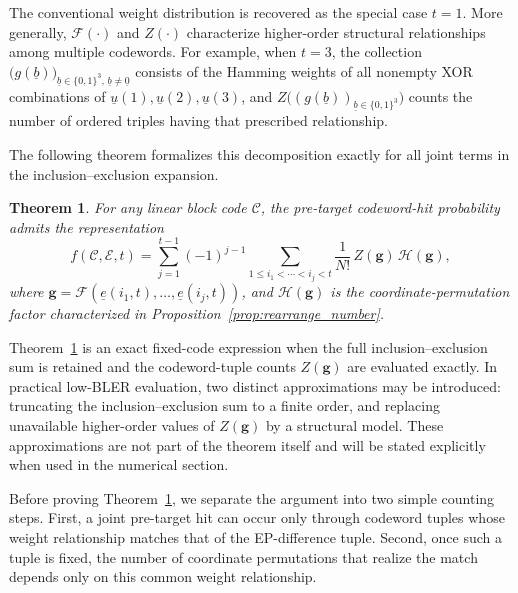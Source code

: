 \documentclass[letterpaper,draftclsnofoot,onecolumn]{IEEEtran}
\newtheorem{theorem}{Theorem}%
\begin{document}
The conventional weight distribution is recovered as the special case $t=1$. More generally, $\mathcal{F}(\cdot)$ and $Z(\cdot)$ characterize higher-order structural relationships among multiple codewords. For example, when $t=3$, the collection $\bigl(g(\underline{b})\bigr)_{\underline{b}\in\{0,1\}^3,\,\underline{b}\neq \underline{0}}$ consists of the Hamming weights of all nonempty XOR combinations of $\underline{u}(1),\underline{u}(2),\underline{u}(3)$, and $Z\bigl((g(\underline{b}))_{\underline{b}\in\{0,1\}^3}\bigr)$ counts the number of ordered triples having that prescribed relationship.

The following theorem formalizes this decomposition exactly for all joint terms in the inclusion--exclusion expansion.

\begin{theorem}\label{th:linear_pre_target_hit}
For any linear block code $\mathcal{C}$, the pre-target codeword-hit probability admits the representation
\begin{equation}\label{eq:th_line_mif_main}
f(\mathcal{C},\mathcal{E},t)
= \sum_{j=1}^{t-1} (-1)^{j-1}
\sum_{1\le i_1<\cdots<i_j<t}
\frac{1}{N!}\,
Z(\mathbf{g})\,
\mathcal{H}(\mathbf{g}),
\end{equation}
where $\mathbf{g}=\mathcal{F}(\underline{e}(i_1,t),\ldots,\underline{e}(i_j,t))$, and $\mathcal{H}(\mathbf{g})$ is the coordinate-permutation factor characterized in Proposition~\ref{prop:rearrange_number}.
\end{theorem}

Theorem~\ref{th:linear_pre_target_hit} is an exact fixed-code expression when the full inclusion--exclusion sum is retained and the codeword-tuple counts $Z(\mathbf{g})$ are evaluated exactly. In practical low-BLER evaluation, two distinct approximations may be introduced: truncating the inclusion--exclusion sum to a finite order, and replacing unavailable higher-order values of $Z(\mathbf{g})$ by a structural model. These approximations are not part of the theorem itself and will be stated explicitly when used in the numerical section.

Before proving Theorem~\ref{th:linear_pre_target_hit}, we separate the argument into two simple counting steps. First, a joint pre-target hit can occur only through codeword tuples whose weight relationship matches that of the EP-difference tuple. Second, once such a tuple is fixed, the number of coordinate permutations that realize the match depends only on this common weight relationship.
\end{document}
